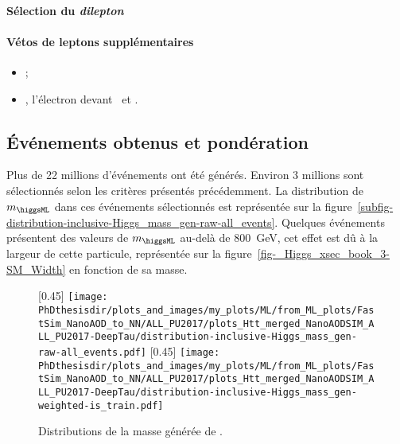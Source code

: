 \paragraph{Sélection du \emph{dilepton}}
\AtLeastOneOSPair{\ele\ele}
\IfMoreOnePair
\paragraph{Vétos de leptons supplémentaires}
\LeptonVetoes
\begin{itemize}
    \item \LeptonVetoesSecondMuon;
    \item \LeptonVetoesSecondEle, l'électron devant \PassConversionVeto\ et \LessTwoMissingHitsVertex.
\end{itemize}
\subsection{Événements obtenus et pondération}
Plus de 22 millions d'événements ont été générés.
Environ 3 millions sont sélectionnés selon les critères présentés précédemment.
La distribution de $m_{\higgsML}$ dans ces événements sélectionnés est représentée sur la figure~\ref{subfig-distribution-inclusive-Higgs_mass_gen-raw-all_events}.
Quelques événements présentent des valeurs de $m_{\higgsML}$ au-delà de \SI{800}{\GeV}, cet effet est dû à la largeur de cette particule,
représentée sur la figure~\ref{fig-_Higgs_xsec_book_3-SM_Width} en fonction de sa masse.
\begin{figure}[h]
\centering

[0.45\textwidth]
{\texttt{[image: \\PhDthesisdir/plots\_and\_images/my\_plots/ML/from\_ML\_plots/FastSim\_NanoAOD\_to\_NN/ALL\_PU2017/plots\_Htt\_merged\_NanoAODSIM\_ALL\_PU2017-DeepTau/distribution-inclusive-Higgs\_mass\_gen-raw-all\_events.pdf]}}
\hfill
{}[0.45\textwidth]
{\texttt{[image: \\PhDthesisdir/plots\_and\_images/my\_plots/ML/from\_ML\_plots/FastSim\_NanoAOD\_to\_NN/ALL\_PU2017/plots\_Htt\_merged\_NanoAODSIM\_ALL\_PU2017-DeepTau/distribution-inclusive-Higgs\_mass\_gen-weighted-is\_train.pdf]}}

\caption[Distributions de la masse générée de \higgsML.]{Distributions de la masse générée de \higgsML.}
\label{fig-distribution-inclusive-Higgs_mass_gen-raw-all_events}
\end{figure}

